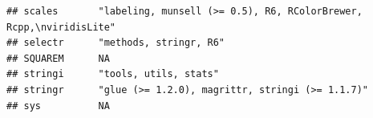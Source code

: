 \documentclass[]{article}
\begin{document}
\begin{verbatim}
## scales       "labeling, munsell (>= 0.5), R6, RColorBrewer, Rcpp,\nviridisLite"                                                                                                                                                                                                                                                                                                                                                                                                                    
## selectr      "methods, stringr, R6"                                                                                                                                                                                                                                                                                                                                                                                                                                                                
## SQUAREM      NA                                                                                                                                                                                                                                                                                                                                                                                                                                                                                    
## stringi      "tools, utils, stats"                                                                                                                                                                                                                                                                                                                                                                                                                                                                 
## stringr      "glue (>= 1.2.0), magrittr, stringi (>= 1.1.7)"                                                                                                                                                                                                                                                                                                                                                                                                                                       
## sys          NA                                                                                                                                                                                                                                                                                                                                                                                                                                                                                    

\end{verbatim}
\end{document}
